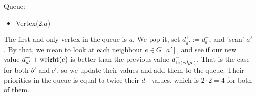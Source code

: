 \begin{minipage}{.75\linewidth}
\end{minipage}\hfill%
\begin{minipage}{.22\linewidth}
    Queue:
    \begin{itemize}
        \item Vertex(2,$a$)
    \end{itemize}
\end{minipage}

The first and only vertex in the queue is $a$. We pop it, set $d^+_{a'} := d^-_a$, and 'scan' $a'$. By that, we mean to look at each neighbour $e \in G[a']$, and see if our new value $d^+_{a'} + \operatorname{weight}(e)$ is better than the previous value $d^-_{\operatorname{to}(edge)}$. That is the case for both $b'$ and $c'$, so we update their values and add them to the queue. Their priorities in the queue is equal to twice their $d^-$ values, which is $2 \cdot 2 = 4$ for both of them.

